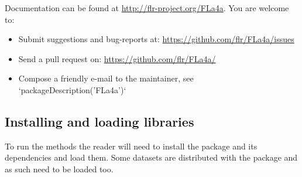 \documentclass[a4paper,english,11pt]{article}
\begin{document}
Documentation can be found at \url{http://flr-project.org/FLa4a}. You are welcome to:

\begin{itemize}
	\item Submit suggestions and bug-reports at: \url{https://github.com/flr/FLa4a/issues}
	\item Send a pull request on: \url{https://github.com/flr/FLa4a/}
	\item Compose a friendly e-mail to the maintainer, see `packageDescription('FLa4a')`
\end{itemize}

\subsection{Installing and loading libraries}

To run the  methods the reader will need to install the package and its dependencies and load them. Some datasets are distributed with the package and as such need to be loaded too.

\begin{knitrout}
\color{fgcolor}\begin{kframe}
\begin{alltt}
\hldef{(}\hldef{(}\hldef{,} \hldef{,} \hldef{,} \hldef{,} \hldef{,} \hldef{))}
\hldef{(}\hldef{(}\hldef{,} \hldef{),}  \hldef{=} \hldef{)}
\end{alltt}
\end{kframe}
\end{knitrout}

\begin{knitrout}
\color{fgcolor}\begin{kframe}
\begin{alltt}
\end{alltt}
\end{kframe}
\end{knitrout}
\end{document}
